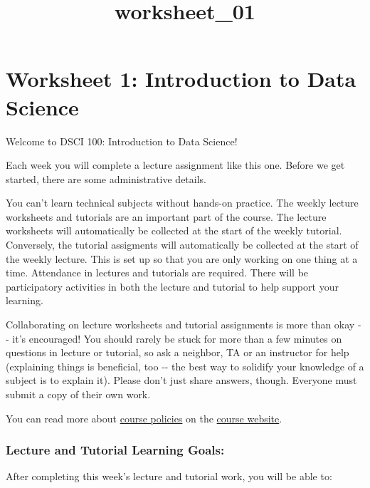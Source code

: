 \documentclass[11pt]{article}
\title{worksheet\_01}
\begin{document}
    
    
    \maketitle
    
    

    
    \section{Worksheet 1: Introduction to Data
Science}\label{worksheet-1-introduction-to-data-science}

Welcome to DSCI 100: Introduction to Data Science!

Each week you will complete a lecture assignment like this one. Before
we get started, there are some administrative details.

You can't learn technical subjects without hands-on practice. The weekly
lecture worksheets and tutorials are an important part of the course.
The lecture worksheets will automatically be collected at the start of
the weekly tutorial. Conversely, the tutorial assigments will
automatically be collected at the start of the weekly lecture. This is
set up so that you are only working on one thing at a time. Attendance
in lectures and tutorials are required. There will be participatory
activities in both the lecture and tutorial to help support your
learning.

Collaborating on lecture worksheets and tutorial assignments is more
than okay -\/- it's encouraged! You should rarely be stuck for more than
a few minutes on questions in lecture or tutorial, so ask a neighbor, TA
or an instructor for help (explaining things is beneficial, too -\/- the
best way to solidify your knowledge of a subject is to explain it).
Please don't just share answers, though. Everyone must submit a copy of
their own work.

You can read more about
\href{https://github.com/UBC-DSCI/dsci-100/blob/master/policies.md}{course
policies} on the \href{https://github.com/UBC-DSCI/dsci-100}{course
website}.

\subsubsection{Lecture and Tutorial Learning
Goals:}\label{lecture-and-tutorial-learning-goals}

After completing this week's lecture and tutorial work, you will be able
to:
\end{document}
